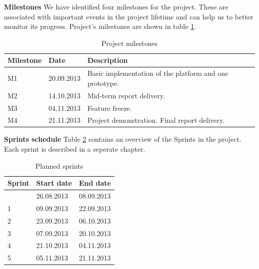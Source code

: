 \textbf{Milestones} \newline
We have identified four milestones for the project. These are associated with important events in the project lifetime and can help us to better monitor its progress. Project's milestones are shown in table \ref{table:milestones}.

\begin{table}[h]
\begin{center}
\begin{tabular}{ | l | l | l | }
  \hline
  Milestone & Date & Description \\
  \hline\noalign{\smallskip}\noalign{\smallskip}\hline
  M1 & 20.09.2013 & Basic implementation of the platform and one prototype. \\ 
  M2 & 14.10.2013 & Mid-term report delivery. \\
  M3 & 04.11.2013 & Feature freeze. \\
  M4 & 21.11.2013 & Project demonstration. Final report delivery. \\
  \hline
\end{tabular}
\end{center}
\caption{Project milestones}
\label{table:milestones}
\end{table}

\textbf{Sprints schedule} \newline
Table \ref{table:sprints} contains an overview of the Sprints in the project.
Each sprint is described in a seperate chapter.

\begin{table}[h]
\begin{center}
\begin{tabular}{ | l | l | l | }
  \hline
  Sprint & Start date & End date \\
  \hline\noalign{\smallskip}\noalign{\smallskip}\hline
  0 & 26.08.2013 & 08.09.2013 \\ 
  1 & 09.09.2013 & 22.09.2013 \\
  2 & 23.09.2013 & 06.10.2013 \\
  3 & 07.09.2013 & 20.10.2013 \\
  4 & 21.10.2013 & 04.11.2013 \\
  5 & 05.11.2013 & 21.11.2013 \\
  \hline
\end{tabular}
\end{center}
\caption{Planned sprints}
\label{table:sprints}
\end{table}


